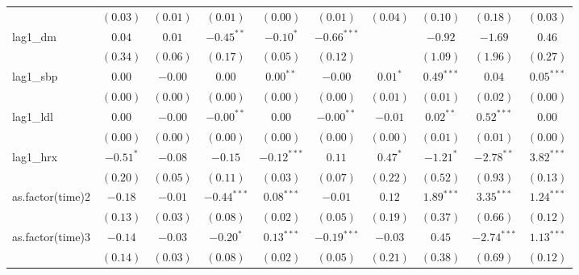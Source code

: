 \begin{tabular}{l c c c c c c c c c}
                 & $(0.03)$      & $(0.01)$      & $(0.01)$      & $(0.00)$      & $(0.01)$      & $(0.04)$       & $(0.10)$      & $(0.18)$      & $(0.03)$       \\
lag1\_dm         & $0.04$        & $0.01$        & $-0.45^{**}$  & $-0.10^{*}$   & $-0.66^{***}$ &                & $-0.92$       & $-1.69$       & $0.46$         \\
                 & $(0.34)$      & $(0.06)$      & $(0.17)$      & $(0.05)$      & $(0.12)$      &                & $(1.09)$      & $(1.96)$      & $(0.27)$       \\
lag1\_sbp        & $0.00$        & $-0.00$       & $0.00$        & $0.00^{**}$   & $-0.00$       & $0.01^{*}$     & $0.49^{***}$  & $0.04$        & $0.05^{***}$   \\
                 & $(0.00)$      & $(0.00)$      & $(0.00)$      & $(0.00)$      & $(0.00)$      & $(0.01)$       & $(0.01)$      & $(0.02)$      & $(0.00)$       \\
lag1\_ldl        & $0.00$        & $-0.00$       & $-0.00^{**}$  & $0.00$        & $-0.00^{**}$  & $-0.01$        & $0.02^{**}$   & $0.52^{***}$  & $0.00$         \\
                 & $(0.00)$      & $(0.00)$      & $(0.00)$      & $(0.00)$      & $(0.00)$      & $(0.00)$       & $(0.01)$      & $(0.01)$      & $(0.00)$       \\
lag1\_hrx        & $-0.51^{*}$   & $-0.08$       & $-0.15$       & $-0.12^{***}$ & $0.11$        & $0.47^{*}$     & $-1.21^{*}$   & $-2.78^{**}$  & $3.82^{***}$   \\
                 & $(0.20)$      & $(0.05)$      & $(0.11)$      & $(0.03)$      & $(0.07)$      & $(0.22)$       & $(0.52)$      & $(0.93)$      & $(0.13)$       \\
as.factor(time)2 & $-0.18$       & $-0.01$       & $-0.44^{***}$ & $0.08^{***}$  & $-0.01$       & $0.12$         & $1.89^{***}$  & $3.35^{***}$  & $1.24^{***}$   \\
                 & $(0.13)$      & $(0.03)$      & $(0.08)$      & $(0.02)$      & $(0.05)$      & $(0.19)$       & $(0.37)$      & $(0.66)$      & $(0.12)$       \\
as.factor(time)3 & $-0.14$       & $-0.03$       & $-0.20^{*}$   & $0.13^{***}$  & $-0.19^{***}$ & $-0.03$        & $0.45$        & $-2.74^{***}$ & $1.13^{***}$   \\
                 & $(0.14)$      & $(0.03)$      & $(0.08)$      & $(0.02)$      & $(0.05)$      & $(0.21)$       & $(0.38)$      & $(0.69)$      & $(0.12)$       \\

\end{tabular}
